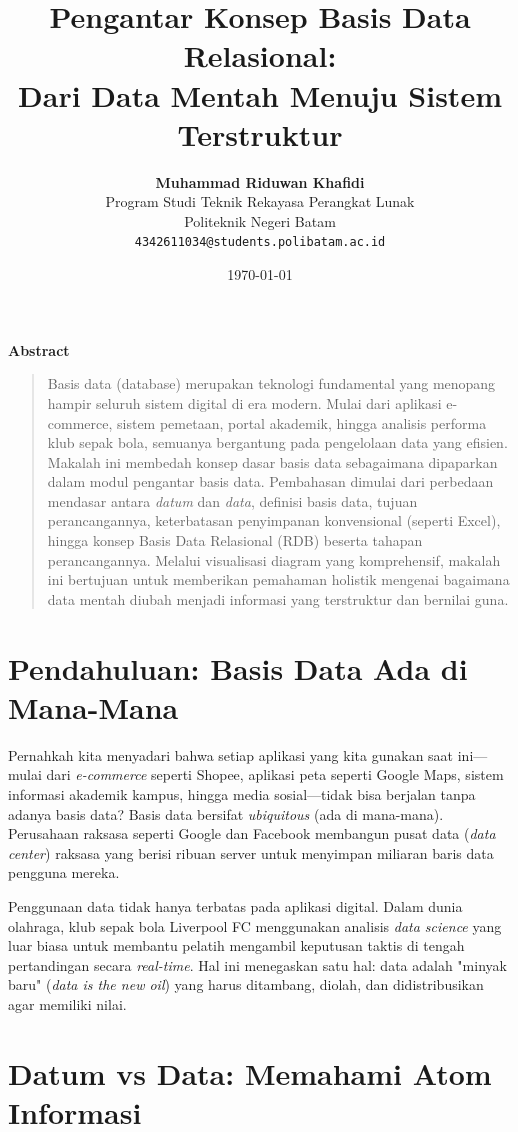 \documentclass[11pt,a4paper]{article}
\title{\vspace{-1.5cm}\textbf{\sffamily\LARGE Pengantar Konsep Basis Data Relasional:\\ Dari Data Mentah Menuju Sistem Terstruktur}}
\author{
	\textbf{Muhammad Riduwan Khafidi} \\
	\small Program Studi Teknik Rekayasa Perangkat Lunak \\
	\small Politeknik Negeri Batam \\
	\small \texttt{4342611034@students.polibatam.ac.id}
}
\date{\small\today}
\renewenvironment{abstract}
{\small
	\begin{center}\textbf{\sffamily Abstract}\end{center}
	\begin{quote}}
	{\end{quote}}
\begin{document}
\maketitle
\thispagestyle{empty}

\begin{abstract}
	Basis data (database) merupakan teknologi fundamental yang menopang hampir seluruh sistem digital di era modern. Mulai dari aplikasi e-commerce, sistem pemetaan, portal akademik, hingga analisis performa klub sepak bola, semuanya bergantung pada pengelolaan data yang efisien. Makalah ini membedah konsep dasar basis data sebagaimana dipaparkan dalam modul pengantar basis data. Pembahasan dimulai dari perbedaan mendasar antara \textit{datum} dan \textit{data}, definisi basis data, tujuan perancangannya, keterbatasan penyimpanan konvensional (seperti Excel), hingga konsep Basis Data Relasional (RDB) beserta tahapan perancangannya. Melalui visualisasi diagram yang komprehensif, makalah ini bertujuan untuk memberikan pemahaman holistik mengenai bagaimana data mentah diubah menjadi informasi yang terstruktur dan bernilai guna.
\end{abstract}

\section{Pendahuluan: Basis Data Ada di Mana-Mana}

Pernahkah kita menyadari bahwa setiap aplikasi yang kita gunakan saat ini—mulai dari \textit{e-commerce} seperti Shopee, aplikasi peta seperti Google Maps, sistem informasi akademik kampus, hingga media sosial—tidak bisa berjalan tanpa adanya basis data? Basis data bersifat \textit{ubiquitous} (ada di mana-mana). Perusahaan raksasa seperti Google dan Facebook membangun pusat data (\textit{data center}) raksasa yang berisi ribuan server untuk menyimpan miliaran baris data pengguna mereka.

Penggunaan data tidak hanya terbatas pada aplikasi digital. Dalam dunia olahraga, klub sepak bola Liverpool FC menggunakan analisis \textit{data science} yang luar biasa untuk membantu pelatih mengambil keputusan taktis di tengah pertandingan secara \textit{real-time}. Hal ini menegaskan satu hal: data adalah "minyak baru" (\textit{data is the new oil}) yang harus ditambang, diolah, dan didistribusikan agar memiliki nilai.

\section{Datum vs Data: Memahami Atom Informasi}
\end{document}
